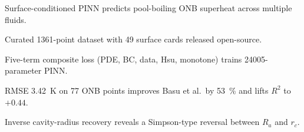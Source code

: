 
\begin{highlights}
\item Surface-conditioned PINN predicts pool-boiling ONB superheat across
      multiple fluids.
\item Curated \num{1361}-point dataset with \num{49} surface cards released
      open-source.
\item Five-term composite loss (PDE, BC, data, Hsu, monotone) trains
      \num{24005}-parameter PINN.
\item RMSE \SI{3.42}{K} on \num{77} ONB points improves Basu et al.\ by
      \SI{53}{\percent} and lifts $R^2$ to $+0.44$.
\item Inverse cavity-radius recovery reveals a Simpson-type reversal between
      $R_a$ and $r_c$.
\end{highlights}
